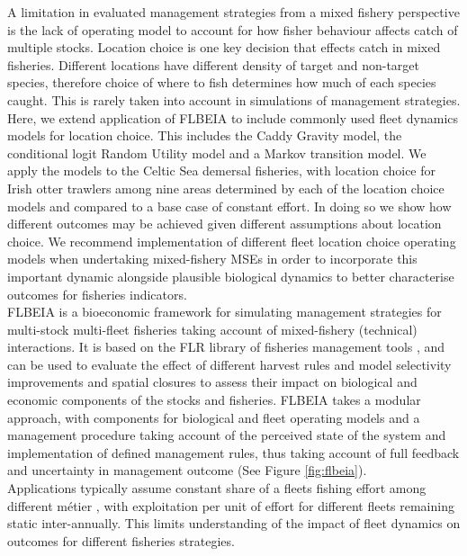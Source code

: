 \documentclass[12pt, halfline, a4paper]{ouparticle}
\begin{document}
A limitation in evaluated management strategies from a mixed fishery
perspective is the lack of operating model to account for how fisher behaviour
affects catch of multiple stocks. Location choice is one key decision that
effects catch in mixed fisheries. Different locations have different density of
target and non-target species, therefore choice of where to fish determines how
much of each species caught. This is rarely taken into account in simulations
of management strategies.\\

Here, we extend application of FLBEIA to include commonly used fleet dynamics
models for location choice. This includes the Caddy Gravity model, the
conditional logit Random Utility model and a Markov transition model. We apply
the models to the Celtic Sea demersal fisheries, with location choice for Irish
otter trawlers among nine areas determined by each of the location choice
models and compared to a base case of constant effort. In doing so we show how
different outcomes may be achieved given different assumptions about location
choice. We recommend implementation of different fleet location choice
operating models when undertaking mixed-fishery MSEs in order to incorporate
this important dynamic alongside plausible biological dynamics to better
characterise outcomes for fisheries indicators. \\

FLBEIA \citep{Garcia2017} is a bioeconomic framework for simulating management
strategies for multi-stock multi-fleet fisheries taking account of
mixed-fishery (technical) interactions. It is based on the FLR library of
fisheries management tools \citep{Kell2007}, and can be used to evaluate the
effect of different harvest rules and model selectivity improvements and
spatial closures to assess their impact on biological and economic components
of the stocks and fisheries.  FLBEIA takes a modular approach, with components
for biological and fleet operating models and a management procedure taking
account of the perceived state of the system and implementation of defined
management rules, thus taking account of full feedback and uncertainty in
management outcome (See Figure \ref{fig:flbeia}). \\

Applications typically assume constant share of a fleets fishing effort among
different métier \citep{Ulrich2016, Garcia2020}, with exploitation per unit of
effort for different fleets remaining static inter-annually. This limits
understanding of the impact of fleet dynamics on outcomes for different
fisheries strategies. 
\end{document}
